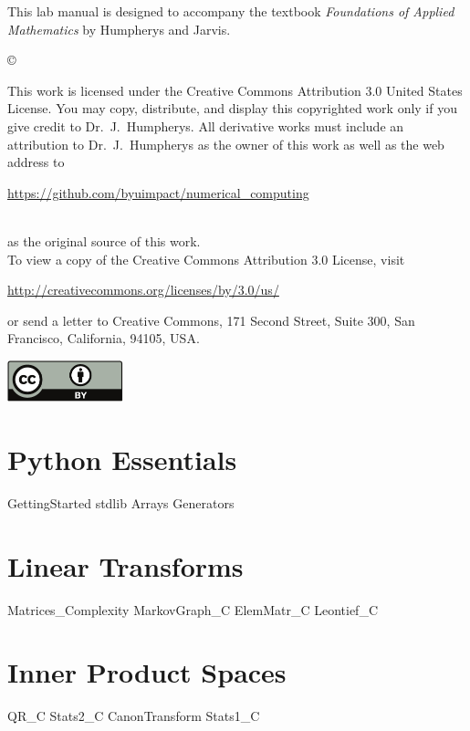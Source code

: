 \documentclass[nociteref]{newsiambook}
\begin{document}
\begin{thepreface}
This lab manual is designed to accompany the textbook \emph{Foundations of Applied Mathematics} by Humpherys and Jarvis.

\vfill
\copyright{This work is licensed under the Creative Commons Attribution 3.0 United States 
License.  You may copy, distribute, and display this copyrighted work only if you give 
credit to Dr.~J.~Humpherys. All derivative works must include an attribution to Dr.~J.~Humpherys as the owner of this work as well as the web address to 
\\\centerline{\url{https://github.com/byuimpact/numerical_computing}}\\ as the original source of 
this 
work.\\To view a copy of the Creative Commons Attribution 3.0 License, 
visit\\\centerline{\url{http://creativecommons.org/licenses/by/3.0/us/}} or send a letter to 
Creative Commons, 171 Second Street, Suite 300, San Francisco, California, 94105, USA.}

\vfill
\centering\includegraphics[height=1.2cm]{by}
\vfill
\end{thepreface}

\setcounter{tocdepth}{1}
\tableofcontents

\mainmatter

\part{Python Essentials}
{GettingStarted}
{stdlib}
{Arrays}
{Generators}

\part{Linear Transforms}
{Matrices_Complexity}
{MarkovGraph_C}
{ElemMatr_C}
{Leontief_C}

\part{Inner Product Spaces}
{QR_C}
{Stats2_C}
{CanonTransform} 
{Stats1_C}
\end{document}
